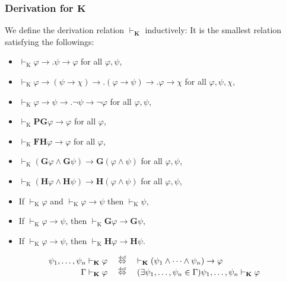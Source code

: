 \documentclass[xcolor=x11names]{beamer}
\newcommand{\FD}{\mathbf F}
\newcommand{\FB}{\mathbf G}
\newcommand{\PD}{\mathbf P}
\newcommand{\PB}{\mathbf H}
\newcommand{\defekv}[1][.1]{\hspace{#1cm}\overset{\textup{\tiny def}}{ \Leftrightarrow }\hspace{#1cm}}
\newcommand{\lthen}{\rightarrow}
\newcommand{\derives}[1][]{\vdash_{\mathrm{#1}}}
\begin{document}
\begin{frame}[t]
\frametitle{Derivation for $\mathbf K$}
We define the derivation relation $\derives[\mathbf K]$ inductively: It is the smallest relation satisfying the followings:
\begin{itemize}
\item $\derives[K]\varphi \lthen .\psi \lthen \varphi$ for all $\varphi, \psi$,
\item $\derives[K]\varphi\lthen (\psi \lthen \chi) \lthen . (\varphi \lthen \psi) \lthen . \varphi \lthen \chi$ for all $\varphi, \psi, \chi$,
\item $\derives[K]\varphi \lthen \psi \lthen .\lnot \psi \lthen \lnot \varphi$ for all $\varphi, \psi$,
\item $\derives[K]\PD\FB\varphi \lthen \varphi $ for all $\varphi$,
\item $\derives[K]\FD\PB\varphi \lthen \varphi$ for all $\varphi$,
\item $\derives[K](\FB\varphi \land \FB \psi )\lthen \FB(\varphi \land \psi )$ for all $\varphi, \psi$,
\item $\derives[K](\PB\varphi \land \PB \psi )\lthen \PB(\varphi \land \psi )$ for all $\varphi, \psi$,
\item If $\derives[K]\varphi$ and  $\derives[K]\varphi \lthen \psi$ then $\derives[K]\psi$,
\item If $\derives[K]\varphi\lthen \psi$, then $\derives[K]\FB\varphi \lthen \FB\psi$,
\item If $\derives[K]\varphi\lthen \psi$, then $\derives[K]\PB\varphi \lthen \PB\psi$.
\end{itemize}
\[\begin{array}{rcl}
\psi_1, \dots , \psi_n\derives[\mathbf K]\varphi&\defekv & \derives[\mathbf K] (\psi_1 \land \dots \land \psi_n)\lthen \varphi
\\ \Gamma\derives[\mathbf K]\varphi&\defekv &(\exists \psi_1, \dots , \psi_n \in \Gamma) \psi_1, \dots , \psi_n\derives[\mathbf K]\varphi\end{array}\]
\end{frame}

\end{document}
